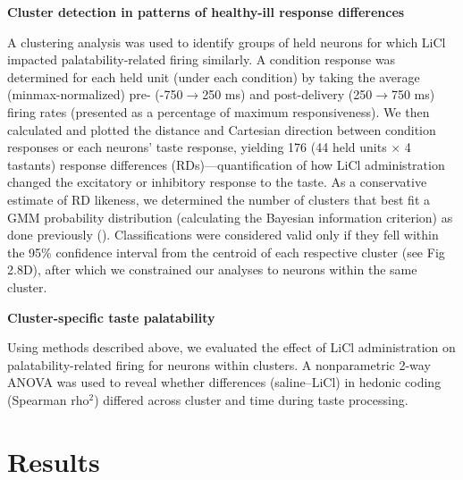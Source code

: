 \begin{refsection}
\smallskip
\noindent\textbf{Cluster detection in patterns of healthy-ill response differences}\par
\noindent 
A clustering analysis was used to identify groups of held neurons for which LiCl impacted palatability-related firing similarly. A condition response was determined for each held unit (under each condition) by taking the average (minmax-normalized) pre- (-750$\rightarrow$250 ms) and post-delivery (250$\rightarrow$750 ms) firing rates (presented as a percentage of maximum responsiveness). We then calculated and plotted the distance and Cartesian direction between condition responses or each neurons’ taste response, yielding 176 (44 held units × 4 tastants) response differences (RDs)—quantification of how LiCl administration changed the excitatory or inhibitory response to the taste. As a conservative estimate of RD likeness, we determined the number of clusters that best fit a GMM probability distribution (calculating the Bayesian information criterion) as done previously (\cite{athey2019a}). Classifications were considered valid only if they fell within the 95\% confidence interval from the centroid of each respective cluster (see Fig 2.8D), after which we constrained our analyses to neurons within the same cluster.

\smallskip
\noindent\textbf{Cluster-specific taste palatability}\par
\noindent 
Using methods described above, we evaluated the effect of LiCl administration on palatability-related firing for neurons within clusters. A nonparametric 2-way ANOVA was used to reveal whether differences (saline–LiCl) in hedonic coding (Spearman rho$^2$) differed across cluster and time during taste processing.

\section{Results}

\end{refsection}

